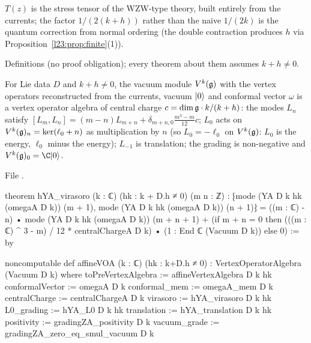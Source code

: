 \begin{physics}
$T(z)$ is the stress tensor of the WZW-type theory, built entirely from the currents; the factor $1/(2(k+h))$
rather than the naive $1/(2k)$ is the quantum correction from normal ordering (the double contraction produces
$h$ via Proposition~\ref{l23:prop:finite}(1)).
\end{physics}

\begin{status}
Definitions (no proof obligation); every theorem about them assumes $k+h\ne0$.
\end{status}

\begin{theorem}\label{l23:thm:affineVOA}
For Lie data $D$ and $k+h\ne0$, the vacuum module $V^k(\mathfrak g)$ with the vertex operators reconstructed from the currents,
vacuum $|0\rangle$ and conformal vector $\omega$ is a vertex operator algebra of central charge
$c=\dim\mathfrak g\cdot k/(k+h)$: the modes $L_n$ satisfy
$[L_m,L_n]=(m-n)L_{m+n}+\delta_{m+n,0}\frac{m^3-m}{12}c$; $L_0$ acts on $V^k(\mathfrak g)_n=\ker(\ell_0+n)$ as multiplication by $n$
(so $L_0=-\ell_0$ on $V^k(\mathfrak g)$: $L_0$ is the energy, $\ell_0$ minus the energy); $L_{-1}$ is translation; the
grading is non-negative and $\lxxiiiV_0=\C\lxxiiivac$.
\end{theorem}
\noindent File .
\begin{leancode}
theorem hYA_virasoro (k : ℂ) (hk : k + D.h ≠ 0) (m n : ℤ) :
    ⁅mode (YA D k hk (omegaA D k)) (m + 1), mode (YA D k hk (omegaA D k)) (n + 1)⁆
      = ((m : ℂ) - n) • mode (YA D k hk (omegaA D k)) (m + n + 1)
        + (if m + n = 0 then
            (((m : ℂ) ^ 3 - m) / 12 * centralChargeA D k) • (1 : End ℂ (Vacuum D k))
           else 0) := by

noncomputable def affineVOA (k : ℂ) (hk : k+D.h ≠ 0) :
    VertexOperatorAlgebra (Vacuum D k) where
  toPreVertexAlgebra := affineVertexAlgebra D k hk
  conformalVector := omegaA D k
  conformal_mem := omegaA_mem D k
  centralCharge := centralChargeA D k
  virasoro := hYA_virasoro D k hk
  L0_grading := hYA_L0 D k hk
  translation := hYA_translation D k hk
  positivity := gradingZA_positivity D k
  vacuum_grade := gradingZA_zero_eq_smul_vacuum D k
\end{leancode}

